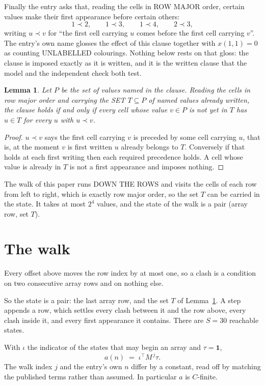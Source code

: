 \documentclass[11pt,a4paper]{article}
\theoremstyle{plain}
\newtheorem{lemma}[theorem]{Lemma}
\theoremstyle{definition}
\begin{document}
Finally the entry asks that, reading the cells in ROW MAJOR order, certain values make their
first appearance before certain others:
\[
1\prec 2,\qquad 1\prec 3,\qquad 1\prec 4,\qquad 2\prec 3 ,
\]
writing $u\prec v$ for ``the first cell carrying $u$ comes before the first cell carrying
$v$''. The entry's own name glosses the effect of this clause together with $x(1,1)=0$ as
counting UNLABELLED colourings. Nothing below rests on that gloss: the clause is imposed
exactly as it is written, and it is the written clause that the model and the independent
check both test.

\begin{lemma}\label{lem:seen}
Let $P$ be the set of values named in the clause. Reading the cells in row major order and
carrying the SET $T\subseteq P$ of named values already written, the clause holds if and only
if every cell whose value $v\in P$ is not yet in $T$ has $u\in T$ for every $u$ with $u\prec v$.
\end{lemma}

\begin{proof}
$u\prec v$ says the first cell carrying $v$ is preceded by some cell carrying $u$, that is, at
the moment $v$ is first written $u$ already belongs to $T$. Conversely if that holds at each
first writing then each required precedence holds. A cell whose value is already in $T$ is not
a first appearance and imposes nothing.
\end{proof}

The walk of this paper runs DOWN THE ROWS and visits the cells of each row from left to right,
which is exactly row major order, so the set $T$ can be carried in the state. It takes at most
$2^{4}$ values, and the state of the walk is a pair (array row, set $T$).

\section{The walk}

Every offset above moves the row index by at most one, so a clash is a condition on two
consecutive array rows and on nothing else.

So the state is a pair: the last array row, and the set $T$ of Lemma~\ref{lem:seen}. A step
appends a row, which settles every clash between it and the row above, every clash inside it,
and every first appearance it contains. There are $S=30$ reachable states.

With $\iota$ the indicator of the states that may begin an array and $\tau=\mathbf{1}$,
\[
a(n)\;=\;\iota^{\!\top}M^{\,j}\tau .
\]
The walk index $j$ and the entry's own $n$ differ by a constant, read off by matching the
published terms rather than assumed. In particular $a$ is $C$-finite.
\end{document}
